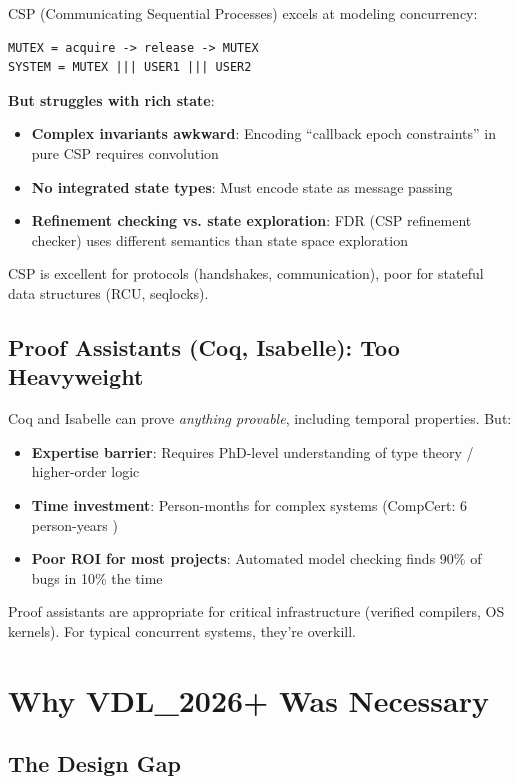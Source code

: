 \documentclass[11pt]{article}
\begin{document}
CSP (Communicating Sequential Processes) excels at modeling concurrency:

\begin{verbatim}
MUTEX = acquire -> release -> MUTEX
SYSTEM = MUTEX ||| USER1 ||| USER2
\end{verbatim}

\textbf{But struggles with rich state}:

\begin{itemize}
\item \textbf{Complex invariants awkward}: Encoding ``callback epoch constraints'' in pure CSP requires convolution
\item \textbf{No integrated state types}: Must encode state as message passing
\item \textbf{Refinement checking vs. state exploration}: FDR (CSP refinement checker) uses different semantics than state space exploration
\end{itemize}

CSP is excellent for protocols (handshakes, communication), poor for stateful data structures (RCU, seqlocks).

\subsection{Proof Assistants (Coq, Isabelle): Too Heavyweight}

Coq and Isabelle can prove \textit{anything provable}, including temporal properties. But:

\begin{itemize}
\item \textbf{Expertise barrier}: Requires PhD-level understanding of type theory / higher-order logic
\item \textbf{Time investment}: Person-months for complex systems (CompCert: 6 person-years \cite{leroy2016})
\item \textbf{Poor ROI for most projects}: Automated model checking finds 90\% of bugs in 10\% the time
\end{itemize}

Proof assistants are appropriate for critical infrastructure (verified compilers, OS kernels). For typical concurrent systems, they're overkill.

\section{Why VDL\_2026+ Was Necessary}

\subsection{The Design Gap}
\end{document}
